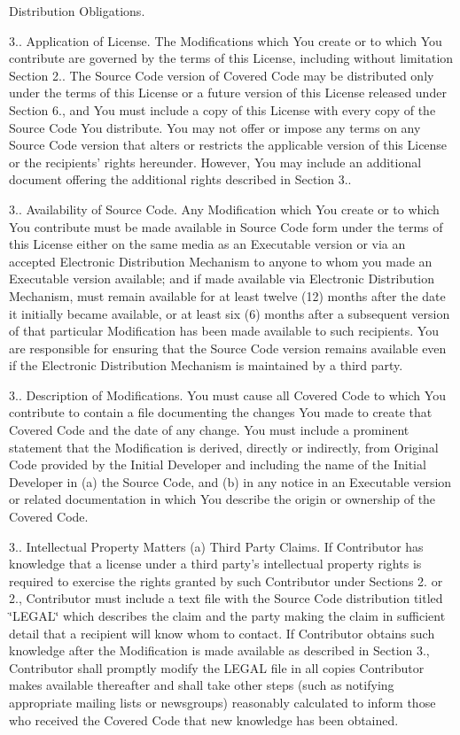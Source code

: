 \begin{DoxyEnumerate}
\item Distribution Obligations.

3.. Application of License. The Modifications which You create or to which You contribute are governed by the terms of this License, including without limitation Section 2.. The Source Code version of Covered Code may be distributed only under the terms of this License or a future version of this License released under Section 6., and You must include a copy of this License with every copy of the Source Code You distribute. You may not offer or impose any terms on any Source Code version that alters or restricts the applicable version of this License or the recipients' rights hereunder. However, You may include an additional document offering the additional rights described in Section 3..

3.. Availability of Source Code. Any Modification which You create or to which You contribute must be made available in Source Code form under the terms of this License either on the same media as an Executable version or via an accepted Electronic Distribution Mechanism to anyone to whom you made an Executable version available; and if made available via Electronic Distribution Mechanism, must remain available for at least twelve (12) months after the date it initially became available, or at least six (6) months after a subsequent version of that particular Modification has been made available to such recipients. You are responsible for ensuring that the Source Code version remains available even if the Electronic Distribution Mechanism is maintained by a third party.

3.. Description of Modifications. You must cause all Covered Code to which You contribute to contain a file documenting the changes You made to create that Covered Code and the date of any change. You must include a prominent statement that the Modification is derived, directly or indirectly, from Original Code provided by the Initial Developer and including the name of the Initial Developer in (a) the Source Code, and (b) in any notice in an Executable version or related documentation in which You describe the origin or ownership of the Covered Code.

3.. Intellectual Property Matters (a) Third Party Claims. If Contributor has knowledge that a license under a third party's intellectual property rights is required to exercise the rights granted by such Contributor under Sections 2. or 2., Contributor must include a text file with the Source Code distribution titled \char`\"{}\-L\-E\-G\-A\-L\char`\"{} which describes the claim and the party making the claim in sufficient detail that a recipient will know whom to contact. If Contributor obtains such knowledge after the Modification is made available as described in Section 3., Contributor shall promptly modify the L\-E\-G\-A\-L file in all copies Contributor makes available thereafter and shall take other steps (such as notifying appropriate mailing lists or newsgroups) reasonably calculated to inform those who received the Covered Code that new knowledge has been obtained.


\end{DoxyEnumerate}
